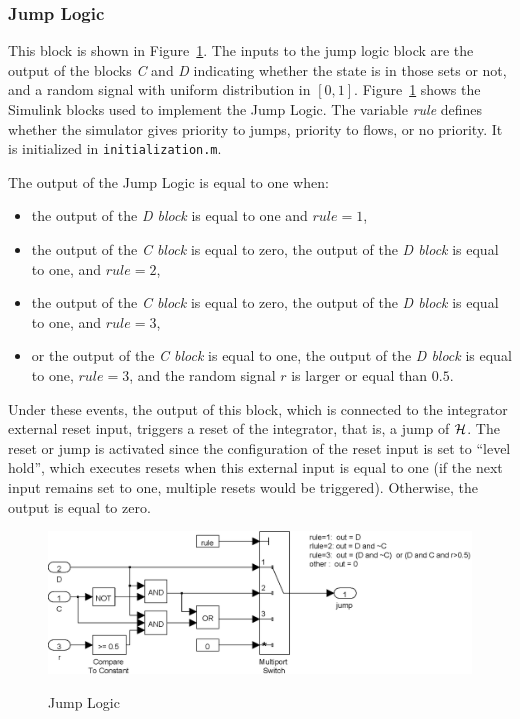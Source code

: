 \documentclass{article}
\begin{document}
\subsubsection{Jump Logic}

This block is shown in Figure~\ref{fig:JumpLogic}. 
The inputs to the jump logic block are the output of the blocks {\em C} and {\em D} 
indicating whether the state is in those sets or not, 
and a random signal with uniform distribution in $[0,1]$. 
Figure~\ref{fig:JumpLogic} shows the Simulink blocks used to implement the Jump Logic. 
The variable {\em rule} defines whether the simulator gives priority to jumps, 
priority to flows, or no priority. It is initialized in {\tt initialization.m}.

The output of the Jump Logic is equal to one when:
\begin{itemize}
\item the output of the {\em D block} is equal to one and $rule=1$,
\item the output of the {\em C block} is equal to zero, 
      the output of the {\em D block} is equal to one, and $rule=2$,
\item the output of the {\em C block} is equal to zero, 
      the output of the {\em D block} is equal to one, and $rule=3$,
\item or the output of the {\em C block} is equal to one, 
      the output of the {\em D block} is equal to one, $rule = 3$, 
      and the random signal $r$ is larger or equal than $0.5$.
\end{itemize}
Under these events, the output of this block, which is connected to the integrator external 
reset input, triggers a reset of the integrator, that is, a jump of $\mathcal{H}$. 
The reset or jump is activated since the configuration of the reset input is set 
to ``level hold'', which executes resets when this external input is equal to one 
(if the next input remains set to one, multiple resets would be triggered). 
Otherwise, the output is equal to zero.

\begin{figure}[ht]
  \begin{center}
    {\includegraphics[width=.8\textwidth]{figures/Simulink/JumpLogic.eps}}
   \caption{Jump Logic}
\label{fig:JumpLogic}
  \end{center}
\end{figure}
\end{document}
